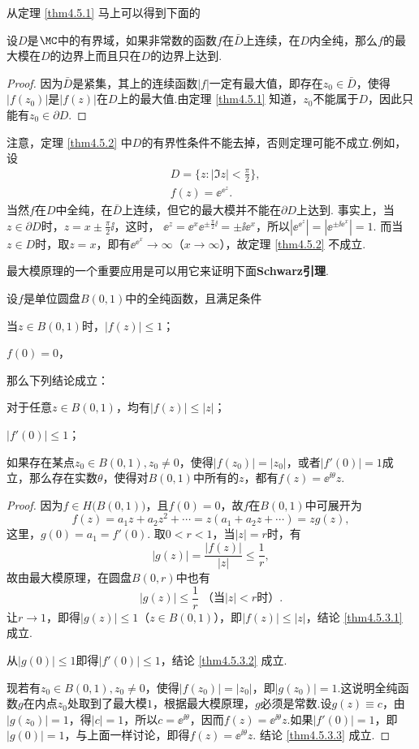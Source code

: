 从定理 \ref{thm4.5.1} 马上可以得到下面的
\begin{theorem}\label{thm4.5.2}
设$D$是$\MC$中的有界域，如果非常数的函数$f$在$\bar D$上连续，在$D$内全纯，那么$f$的最大模在$D$的边界上而且只在$D$的边界上达到.
\end{theorem}
\begin{proof}
因为$\bar D$是紧集，其上的连续函数$|f|$一定有最大值，即存在$z_0\in\bar D$，使得$|f(z_0)|$是$|f(z)|$在$D$上的最大值.由定理 \ref{thm4.5.1} 知道，$z_0$不能属于$D$，因此只能有$z_0\in\partial D$.
\end{proof}

注意，定理 \ref{thm4.5.2} 中$D$的有界性条件不能去掉，否则定理可能不成立.例如，设
\begin{align*}
&D=\bigg\{z:|\Im z|<\frac\pi2\bigg\},\\
&f(z)=\ee^{\ee^z}.
\end{align*}
当然$f$在$D$中全纯，在$\bar D$上连续，但它的最大模并不能在$\partial D$上达到. 事实上，当$z\in \partial D$时，$z=x\pm\frac\pi2\ii$，这时， $\ee^z=\ee^x\ee^ {\pm\frac\pi2\ii}=\pm\ii\ee^x$，所以$|\ee^{\ee^z}|=|\ee^{\pm\ii\ee^x}|=1$. 而当$z\in D$时，取$z=x$，即有$\ee^{\ee^x}\to\infty$（$x\to\infty$），故定理 \ref{thm4.5.2} 不成立.

最大模原理的一个重要应用是可以用它来证明下面\textbf{Schwarz引理}.
\begin{theorem}\label{thm4.5.3}
设$f$是单位圆盘$B(0,1)$中的全纯函数，且满足条件
\begin{eenum}
  \item 当$z\in B(0,1)$时，$|f(z)|\le1$；
  \item $f(0)=0$，
\end{eenum}
那么下列结论成立：
\begin{eenum}
  \item \label{thm4.5.3.1} 对于任意$z\in B(0,1)$，均有$|f(z)|\le |z|$；
  \item \label{thm4.5.3.2} $|f'(0)|\le1$；
  \item \label{thm4.5.3.3} 如果存在某点$z_0\in B(0,1),z_0\ne0$，使得$|f(z_0)|=|z_0|$，或者$|f'(0)|=1$成立，那么存在实数$\theta$，使得对$B(0,1)$中所有的$z$，都有$f(z)=\ee^{\ii\theta}z$.
\end{eenum}
\end{theorem}
\begin{proof}
因为$f\in H\big(B(0,1)\big)$，且$f(0)=0$，故$f$在$B(0,1)$中可展开为
\[
  f(z)=a_1z+a_2z^2+\cdots=z(a_1+a_2z+\cdots)=zg(z),
\]
这里，$g(0)=a_1=f'(0)$. 取$0<r<1$，当$|z|=r$时，有
\[|g(z)|=\frac{|f(z)|}{|z|}\le\frac1r,\]
故由最大模原理，在圆盘$B(0,r)$中也有
\[|g(z)|\le\frac1r\;\mbox{（当$|z|<r$时）}.\]
让$r\to1$，即得$|g(z)|\le1$（$z\in B(0,1)$），即$|f(z)|\le|z|$，结论 \ref{thm4.5.3.1} 成立.

从$|g(0)|\le1$即得$|f'(0)|\le1$，结论 \ref{thm4.5.3.2} 成立.

现若有$z_0\in B(0,1),z_0\ne0$，使得$|f(z_0)|=|z_0|$，即$|g(z_0)|=1$.这说明全纯函数$g$在内点$z_0$处取到了最大模$1$，根据最大模原理，$g$必须是常数.设$g(z)\equiv c$，由$|g(z_0)|=1$，得$|c|=1$，所以$c=\ee^{\ii\theta}$，因而$f(z)=\ee^ {\ii\theta}z$.如果$|f'(0)|=1$，即$|g(0)|=1$，与上面一样讨论，即得$f(z)=\ee^ {\ii\theta}z$. 结论 \ref{thm4.5.3.3} 成立.
\end{proof}

